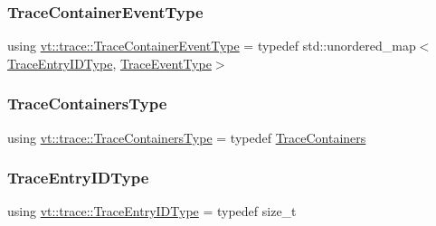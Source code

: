\mbox{\label{namespacevt_1_1trace_a80118aaa48fed940af3899800bba2303}} 
\subsubsection{\texorpdfstring{Trace\+Container\+Event\+Type}{TraceContainerEventType}}
{\footnotesize\ttfamily using \hyperlink{namespacevt_1_1trace_a80118aaa48fed940af3899800bba2303}{vt\+::trace\+::\+Trace\+Container\+Event\+Type} = typedef std\+::unordered\+\_\+map$<$\hyperlink{namespacevt_1_1trace_a3c14050715ba9eceaeff51fb3de64f2f}{Trace\+Entry\+I\+D\+Type}, \hyperlink{namespacevt_1_1trace_a79b7fa947245c08d04a3ea67fbff2c30}{Trace\+Event\+Type}$>$}

\mbox{\label{namespacevt_1_1trace_a526573625774f28d49baddd61b9c701c}} 
\subsubsection{\texorpdfstring{Trace\+Containers\+Type}{TraceContainersType}}
{\footnotesize\ttfamily using \hyperlink{namespacevt_1_1trace_a526573625774f28d49baddd61b9c701c}{vt\+::trace\+::\+Trace\+Containers\+Type} = typedef \hyperlink{classvt_1_1trace_1_1_trace_containers}{Trace\+Containers}}

\mbox{\label{namespacevt_1_1trace_a3c14050715ba9eceaeff51fb3de64f2f}} 
\subsubsection{\texorpdfstring{Trace\+Entry\+I\+D\+Type}{TraceEntryIDType}}
{\footnotesize\ttfamily using \hyperlink{namespacevt_1_1trace_a3c14050715ba9eceaeff51fb3de64f2f}{vt\+::trace\+::\+Trace\+Entry\+I\+D\+Type} = typedef size\+\_\+t}

\mbox{\label{namespacevt_1_1trace_a522028dd2a7d056f0ec3d417836fdecd}} 
